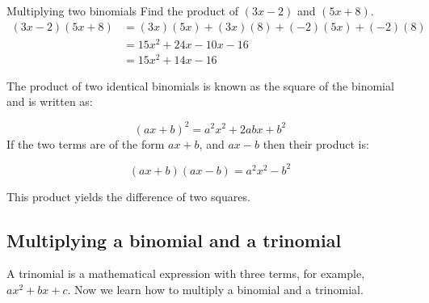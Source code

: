 \begin{wex}{Multiplying two binomials }
{Find the product of $(3x-2)$ and $(5x+8)$. }{
\begin{align*}
  (3x-2)(5x+8) &= (3x)(5x)+(3x)(8)+(-2)(5x)+(-2)(8) \\
  &= 15{x}^{2}+24x-10x-16 \\
  &= 15{x}^{2}+14x-16
\end{align*}
} 
\end{wex}




The product of two identical binomials is known as the square of the binomial and is written as:

\begin{equation*}
{(ax+b)}^{2}={a}^{2}{x}^{2}+2abx+{b}^{2}
\end{equation*}
If the two terms are of the form $ax+b$, and $ax-b$ then their product is:

\begin{equation*}
(ax+b)(ax-b) ={a}^{2}{x}^{2}-{b}^{2}
\end{equation*}

This product yields the difference of two squares.\par 


\subsection*{Multiplying a binomial and a trinomial}







\addtocounter{footnote}{-0}

A trinomial is a mathematical expression with three terms, for example, $ax^{2} + bx + c$.
Now we learn how to multiply a binomial and a
trinomial.\par 


